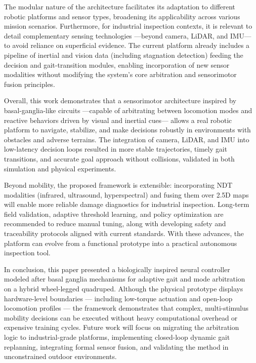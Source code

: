 \documentclass[preprint,12pt]{elsarticle}
\begin{document}
The modular nature of the architecture facilitates its adaptation to different robotic platforms and sensor types, broadening its applicability across various mission scenarios. Furthermore, for industrial inspection contexts, it is relevant to detail complementary sensing technologies ---beyond camera, LiDAR, and IMU--- to avoid reliance on superficial evidence. The current platform already includes a pipeline of inertial and vision data (including stagnation detection) feeding the decision and gait-transition modules, enabling incorporation of new sensor modalities without modifying the system’s core arbitration and sensorimotor fusion principles. 

Overall, this work demonstrates that a sensorimotor architecture inspired by basal-ganglia-like circuits ---capable of arbitrating between locomotion modes and reactive behaviors driven by visual and inertial cues--- allows a real robotic platform to navigate, stabilize, and make decisions robustly in environments with obstacles and adverse terrains. The integration of camera, LiDAR, and IMU into low-latency decision loops resulted in more stable trajectories, timely gait transitions, and accurate goal approach without collisions, validated in both simulation and physical experiments. 

Beyond mobility, the proposed framework is extensible: incorporating NDT modalities (infrared, ultrasound, hyperspectral) and fusing them over 2.5D maps will enable more reliable damage diagnostics for industrial inspection. Long-term field validation, adaptive threshold learning, and policy optimization are recommended to reduce manual tuning, along with developing safety and traceability protocols aligned with current standards. With these advances, the platform can evolve from a functional prototype into a practical autonomous inspection tool.

In conclusion, this paper presented a biologically inspired neural controller modeled after basal ganglia mechanisms for adaptive gait and mode arbitration on a hybrid wheel-legged quadruped. Although the physical prototype displays hardware-level boundaries --- including low-torque actuation and open-loop locomotion profiles --- the framework demonstrates that complex, multi-stimulus mobility decisions can be executed without heavy computational overhead or expensive training cycles. Future work will focus on migrating the arbitration logic to industrial-grade platforms, implementing closed-loop dynamic gait replanning, integrating formal sensor fusion, and validating the method in unconstrained outdoor environments.
\end{document}
